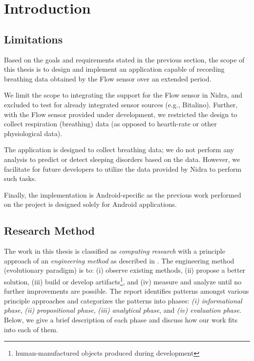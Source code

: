 \chapter{Introduction}\label{introduction}




\section{Limitations}
Based on the goals and requirements stated in the previous section, the scope of this thesis is to design and implement an application capable of recording breathing data obtained by the Flow sensor over an extended period. 

We limit the scope to integrating the support for the Flow sensor in Nidra, and excluded to test for already integrated sensor sources (e.g., Bitalino). Further, with the Flow sensor provided under development, we restricted the design to collect respiration (breathing) data (as opposed to hearth-rate or other physiological data).

The application is designed to collect breathing data; we do not perform any analysis to predict or detect sleeping disorders based on the data. However, we facilitate for future developers to utilize the data provided by Nidra to perform such tasks.

Finally, the implementation is Android-specific as the previous work performed on the project is designed solely for Android applications. 

\section{Research Method}
The work in this thesis is classified as \textit{computing research} with a principle approach of an \textit{engineering method} as described in \cite{Glass_1995}. The engineering method (evolutionary paradigm) is to: (i) observe existing methods, (ii) propose a better solution, (iii)  build or develop artifacts\footnote{human-manufactured objects produced during development}, and (iv) measure and analyze until no further improvements are possible. The report identifies patterns amongst various principle approaches and categorizes the patterns into phases: \textit{(i) informational phase}, \textit{(ii) propositional phase}, \textit{(iii) analytical phase}, and \textit{(iv) evaluation phase}. Below, we give a brief description of each phase and discuss how our work fits into each of them. 

